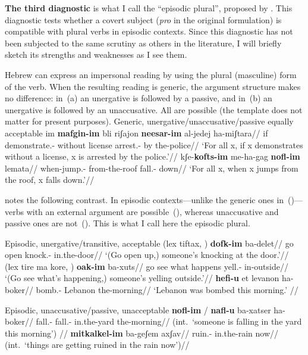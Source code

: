 \textbf{The third diagnostic} is what I call the ``episodic plural'', proposed by \cite{borer98csli,borer05vol2}. This diagnostic tests whether a covert subject (\emph{pro} in the original formulation) is compatible with plural verbs in episodic contexts. Since this diagnostic has not been subjected to the same scrutiny as others in the literature, I will briefly sketch its strengths and weaknesses as I see them.

Hebrew can express an impersonal reading by using the plural (masculine) form of the verb. When the resulting reading is generic, the argument structure makes no difference: in~(\nextx a) an unergative is followed by a passive, and in~(\nextx b) an unergative is followed by an unaccusative. All are possible (the template does not matter for present purposes).
\pex Generic, unergative/unaccusative/passive equally acceptable \citep[86]{borer98csli}
	\a \begingl
		\gla im \textbf{mafgin-im} bli riʃajon \textbf{neesar-im} al-jedej ha-miʃtara//
		\glb if demonstrate.- without license arrest.- by the-police//
		\glft `For all x, if x demonstrates without a license, x is arrested by the police.'//
	\endgl
	\a \begingl
		\gla kʃe-\textbf{kofts-im} me-ha-gag \textbf{nofl-im} lemata//
		\glb when-jump.- from-the-roof fall.- down//
		\glft `For all x, when x jumps from the roof, x falls down.'//
	\endgl
\xe

\cite{borer98csli} notes the following contrast. In episodic contexts---unlike the generic ones in~(\lastx)---verbs with an external argument are possible~(\nextx), whereas unaccusative and passive ones are not~(\anextx). This is what I call here the episodic plural.

\pex Episodic, unergative/transitive, acceptable
	\a \begingl
		\gla (lex tiftax, ) \textbf{dofk-im} ba-delet//
		\glb go open {} knock.- in.the-door//
		\glft `(Go open up,) someone's knocking at the door.'//
	\endgl
	\a \begingl
		\gla (lex tire ma kore, ) \textbf{{\ts}oak-im} ba-xuts//
		\glb go see what happens {} yell.- in-outside//
		\glft `(Go see what's happening,) someone's yelling outside.'//
	\endgl
	\a \begingl
		\gla \textbf{hef{\ts}i{\ts}-u} et levanon ha-boker//
		\glb bomb.-  Lebanon the-morning//
		\glft `Lebanon was bombed this morning.'  //
	\endgl
\xe

\pex Episodic, unaccusative/passive, unacceptable
	\a	\ljudge{*} \begingl
		\gla \textbf{nofl-im} / \textbf{nafl-u} ba-xatser ha-boker//
		\glb fall.- {} fall.- in.the-yard the-morning//
		\glft (int.~`someone is falling in the yard this morning') //
	\endgl
	\a  \ljudge{*} \begingl
		\gla \textbf{mitkalkel-im} ba-geʃem axʃav//
		\glb ruin.- in.the-rain now//
		\glft (int.~`things are getting ruined in the rain now')//
	\endgl
\xe
		
